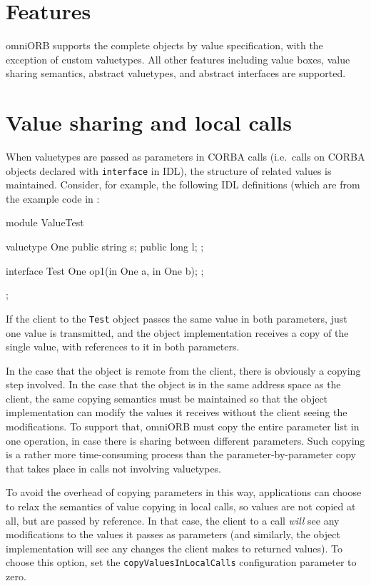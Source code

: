 \documentclass[draft,11pt,twoside,a4paper]{book}
\newcommand{\type}[1]{\texttt{#1}}
\newcommand{\code}[1]{\texttt{#1}}
\newcommand{\file}{\begingroup \urlstyle{tt}\Url}
\begin{document}
\section{Features}

omniORB supports the complete objects by value specification, with the
exception of custom valuetypes. All other features including value
boxes, value sharing semantics, abstract valuetypes, and abstract
interfaces are supported.


\section{Value sharing and local calls}

When valuetypes are passed as parameters in CORBA calls (i.e.\ calls
on CORBA objects declared with \code{interface} in IDL), the structure
of related values is maintained. Consider, for example, the following
IDL definitions (which are from the example code in
\file{src/examples/valuetype/simple}:

\begin{idllisting}
module ValueTest {
  valuetype One {
    public string s;
    public long   l;
  };

  interface Test {
    One op1(in One a, in One b);
  };
};
\end{idllisting}

If the client to the \type{Test} object passes the same value in both
parameters, just one value is transmitted, and the object
implementation receives a copy of the single value, with references to
it in both parameters.

In the case that the object is remote from the client, there is
obviously a copying step involved. In the case that the object is in
the same address space as the client, the same copying semantics must
be maintained so that the object implementation can modify the values
it receives without the client seeing the modifications. To support
that, omniORB must copy the entire parameter list in one operation, in
case there is sharing between different parameters. Such copying is a
rather more time-consuming process than the parameter-by-parameter
copy that takes place in calls not involving valuetypes.

To avoid the overhead of copying parameters in this way, applications
can choose to relax the semantics of value copying in local calls, so
values are not copied at all, but are passed by reference. In that
case, the client to a call \emph{will} see any modifications to the
values it passes as parameters (and similarly, the object
implementation will see any changes the client makes to returned
values). To choose this option, set the \code{copyValuesInLocalCalls}
configuration parameter to zero.
\end{document}
